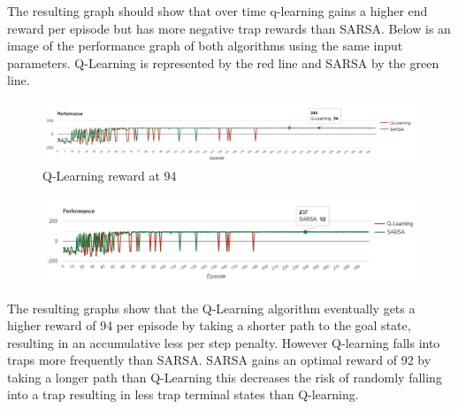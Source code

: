 The resulting graph should show that over time q-learning gains a higher end reward per episode but has more negative trap rewards than SARSA.
Below is an image of the performance graph of both algorithms using the same input parameters.
Q-Learning is represented by the red line and SARSA by the green line.
\begin{figure}[h]
	\centering
	\includegraphics[width=1\linewidth]{"img/Q-learning eval"}
	\caption{Q-Learning reward at 94}
	\label{fig:q-learning-eval}
\end{figure}
\begin{figure}[H]
	\centering
	\includegraphics[width=1\linewidth]{img/SarsaEval}
	\caption{}
	\label{fig:sarsaeval}
\end{figure}

The resulting graphs show that the Q-Learning algorithm eventually gets a higher reward of 94 per episode by taking a shorter path to the goal state, resulting in an accumulative less per step penalty. However Q-learning falls into traps more frequently than SARSA.  SARSA gains an optimal reward of 92  by taking a longer path than Q-Learning this decreases the risk of randomly falling into a trap resulting in less trap terminal states than Q-learning.

